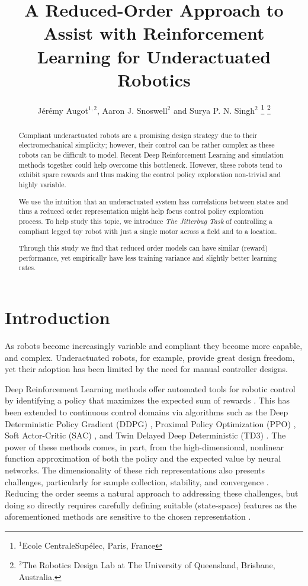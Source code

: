\documentclass[letterpaper, 10 pt, conference]{ieeeconf}
\title{
    \LARGE \bf%
    A Reduced-Order Approach to Assist with Reinforcement Learning for Underactuated Robotics
}
\author{
    J\'er\'emy Augot$^{1,2}$, Aaron J. Snoswell$^{2}$ and Surya P. N. Singh$^{2}$
    \thanks{
        $^{1}$Ecole CentraleSup\'elec, Paris, France
    }%
    \thanks{
        $^{2}$The Robotics Design Lab at The University of Queensland, Brisbane, Australia.  
    }%
}
\begin{document}
\maketitle
\thispagestyle{empty}
\pagestyle{empty}

\begin{abstract}


Compliant underactuated robots are a promising design strategy due to their electromechanical simplicity; however, their control can be rather complex as these robots can be difficult to model.  Recent Deep Reinforcement Learning and simulation methods together could help overcome this bottleneck.  However, these robots tend to exhibit spare rewards and thus making the control policy exploration non-trivial and highly variable.    

We use the intuition that an underactuated system has correlations between states and thus a reduced order representation might help focus control policy exploration process.   To help study this topic, we introduce \emph{The Jitterbug Task} of controlling a compliant legged toy robot with just a single motor across a field and to a location.    

Through this study we find that reduced order models can have similar (reward) performance, yet empirically have less training variance and slightly better learning rates.  

\end{abstract}

\section{Introduction}

As robots become increasingly variable and compliant they become more capable, and complex.
Underactuated robots, for example, provide great design freedom, yet their adoption has been limited by the need for manual controller designs.

Deep Reinforcement Learning methods offer automated tools for robotic control by identifying a policy that maximizes the expected sum of rewards \cite{henderson2018deep}.
This has been extended to continuous control domains via algorithms such as the Deep Deterministic Policy Gradient (DDPG) \cite{DDPG}, Proximal Policy Optimization (PPO) \cite{PPO}, Soft Actor-Critic (SAC) \cite{SAC}, and Twin Delayed Deep Deterministic (TD3) \cite{TD3}.
The power of these methods comes, in part, from the high-dimensional, nonlinear function approximation of both the policy and the expected value by neural networks.
The dimensionality of these rich representations also presents challenges, particularly for sample collection, stability, and convergence \cite{Islam2017}.
Reducing the order seems a natural approach to addressing these challenges, but doing so directly requires carefully defining suitable (state-space) features as the aforementioned methods are sensitive to the chosen representation \cite{bhatnagar2009convergent}.  
\end{document}

